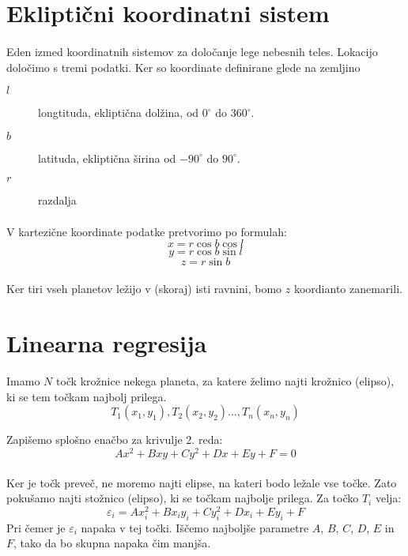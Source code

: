 \documentclass[a4paper, 12pt]{article}
\begin{document}
    \section*{Ekliptični koordinatni sistem}
    \paragraph{}
    Eden izmed koordinatnih sistemov za določanje lege nebesnih teles. Lokacijo določimo s tremi podatki. Ker so koordinate definirane glede na zemljino 
    \begin{description}
        \item[$l$] longtituda, ekliptična dolžina, od $0^\circ$ do $360^\circ$.
        \item[$b$] latituda, ekliptična širina od $-90^\circ$ do $90^\circ$.
        \item[$r$] razdalja
    \end{description}
    
    \paragraph{}
    V kartezične koordinate podatke pretvorimo po formulah:
    $$x = r \cos b \cos l$$
    $$y = r \cos b \sin l$$
    $$z = r \sin b$$

    \paragraph{}
    Ker tiri vseh planetov ležijo v (skoraj) isti ravnini, bomo $z$ koordianto zanemarili.

	\section*{Linearna regresija}
	\paragraph{}
	Imamo $N$ točk krožnice nekega planeta, za katere želimo najti krožnico (elipso), ki se tem točkam najbolj prilega.
	$$T_1(x_1, y_1), T_2(x_2, y_2) \ldots, T_n(x_n, y_n)$$

	Zapišemo splošno enačbo za krivulje 2. reda:
	$$Ax^2 + Bxy + Cy^2 + Dx + Ey + F = 0$$
	
	\paragraph{}
	Ker je točk preveč, ne moremo najti elipse, na kateri bodo ležale vse točke. Zato pokušamo najti stožnico (elipso), ki se točkam najbolje prilega. Za točko $T_i$ velja:
	$$\varepsilon_i = Ax_i^2 + Bx_iy_i + Cy_i^2 + Dx_i + Ey_i + F$$
	Pri čemer je $\varepsilon_i$ napaka v tej točki. Iščemo najboljše parametre $A$, $B$, $C$, $D$, $E$ in $F$, tako da bo skupna napaka čim manjša.
	
\end{document}
